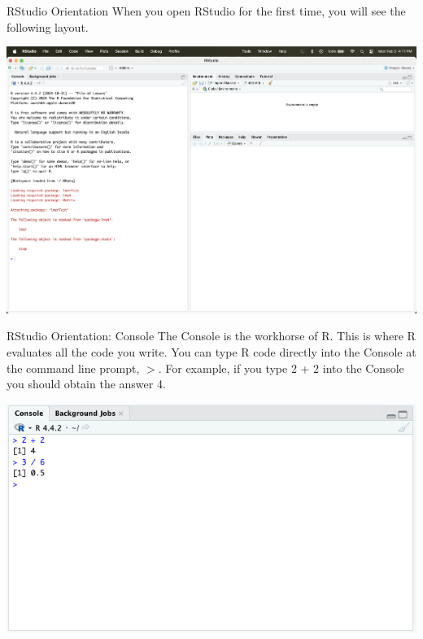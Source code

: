 \documentclass[aspectratio=169,xcolor=dvipsnames]{beamer}
\begin{document}
\begin{frame}{RStudio Orientation}
When you open RStudio for the first time, you will see the following layout.
\begin{center}
\includegraphics[scale=0.2]{images/Rstudio.png}
\end{center}

\end{frame}

\begin{frame}{RStudio Orientation: Console}
The Console is the workhorse of R. This is where R evaluates all the code you write. You can type R code directly into the Console at the command line prompt, $>$. For example, if you type 2 + 2 into the Console you should obtain the answer 4.
\begin{center}
\includegraphics[scale=0.4]{images/console.png}
\end{center}
\end{frame}
\end{document}
